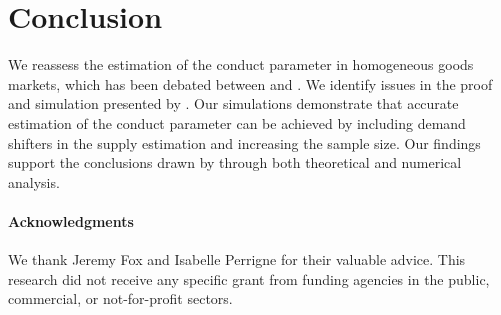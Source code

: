 \documentclass[11pt, a4paper]{article}
\begin{document}
\section{Conclusion}
We reassess the estimation of the conduct parameter in homogeneous goods markets, which has been debated between \citet{bresnahan1982oligopoly} and \citet{perloff2012collinearity}. 
We identify issues in the proof and simulation presented by \citet{perloff2012collinearity}. 
Our simulations demonstrate that accurate estimation of the conduct parameter can be achieved by including demand shifters in the supply estimation and increasing the sample size. 
Our findings support the conclusions drawn by \citet{bresnahan1982oligopoly} through both theoretical and numerical analysis.


\paragraph{Acknowledgments}
We thank Jeremy Fox and Isabelle Perrigne for their valuable advice. 
This research did not receive any specific grant from funding agencies in the public, commercial, or not-for-profit sectors. 

\newpage




\newpage
\appendix


\end{document}
